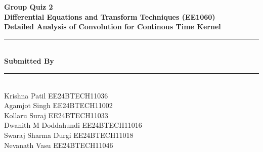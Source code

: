 \documentclass[12pt]{article}
\begin{document}
\begin{titlepage}
    \centering
    \vspace*{1.5cm}
    
    {\Huge\bfseries Group Quiz 2}\\[0.5cm]
    {\Large\bfseries Differential Equations and Transform Techniques (EE1060)}\\[1cm]
    {\Large\bfseries Detailed Analysis of Convolution for Continous Time Kernel}\\[1.5cm]
    
    \rule{0.8\textwidth}{0.4pt}\\[0.5cm]
    {\Large\bfseries Submitted By}\\[0.5cm]
    \rule{0.8\textwidth}{0.4pt}\\[0.5cm]
    
    \large
    Krishna Patil \hfill EE24BTECH11036\\[0.2cm]
    Agamjot Singh \hfill EE24BTECH11002\\[0.2cm]
    Kollaru Suraj \hfill EE24BTECH11033\\[0.2cm]
    Dwanith M Doddahundi \hfill EE24BTECH11016\\[0.2cm]
    Swaraj Sharma Durgi \hfill EE24BTECH11018\\[0.2cm]
    Nevanath Vasu \hfill EE24BTECH11046\\[1.5cm]
    
\end{titlepage}


\tableofcontents
\newpage
\end{document}
